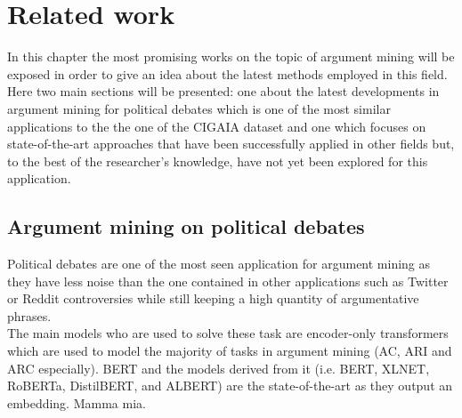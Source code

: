 \chapter{Related work}
In this chapter the most promising works on the topic of argument mining will be exposed in order to give an idea about the latest methods employed in this field.\\
Here two main sections will be presented: one about the latest developments in argument mining for political debates which is one of the most similar applications to the the one of the CIGAIA dataset and one which focuses on state-of-the-art approaches that have been successfully applied in other fields but, to the best of the researcher’s knowledge, have not yet been explored for this application.
\section{Argument mining on political debates}
Political debates are one of the most seen application for argument mining as they have less noise than the one contained in other applications such as Twitter or Reddit controversies while still keeping a high quantity of argumentative phrases.\\
The main models who are used to solve these task are encoder-only transformers which are used
 to model the majority of tasks in argument mining (AC, ARI and ARC especially). 
BERT and the models derived from it (i.e. BERT, XLNET, RoBERTa, DistilBERT, and ALBERT)\cite{BERTbas} are the state-of-the-art as they output an embedding. Mamma  mia.